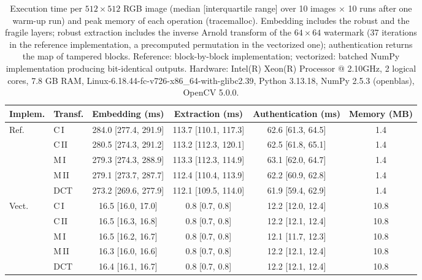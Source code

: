 \begin{table}[t]
\centering
\caption{Execution time per $512\times512$ RGB image (median [interquartile range] over 10 images $\times$ 10 runs after one warm-up run) and peak memory of each operation (tracemalloc). Embedding includes the robust and the fragile layers; robust extraction includes the inverse Arnold transform of the $64\times64$ watermark (37 iterations in the reference implementation, a precomputed permutation in the vectorized one); authentication returns the map of tampered blocks. Reference: block-by-block implementation; vectorized: batched NumPy implementation producing bit-identical outputs. Hardware: Intel(R) Xeon(R) Processor @ 2.10GHz, 2 logical cores, 7.8 GB RAM, Linux-6.18.44-fc-v726-x86\_64-with-glibc2.39, Python 3.13.18, NumPy 2.5.3 (openblas), OpenCV 5.0.0.}
\label{tab:execution_time}
\footnotesize
\setlength{\tabcolsep}{3pt}
\begin{tabular}{llcccc}
\toprule
Implem. & Transf. & Embedding (ms) & Extraction (ms) & Authentication (ms) & Memory (MB) \\
\midrule
Ref. & C\,I & 284.0 [277.4, 291.9] & 113.7 [110.1, 117.3] & 62.6 [61.3, 64.5] & 1.4 \\
 & C\,II & 280.5 [274.3, 291.2] & 113.2 [112.3, 120.1] & 62.5 [61.8, 65.1] & 1.4 \\
 & M\,I & 279.3 [274.3, 288.9] & 113.3 [112.3, 114.9] & 63.1 [62.0, 64.7] & 1.4 \\
 & M\,II & 279.1 [273.7, 287.7] & 112.4 [110.4, 113.9] & 62.2 [60.9, 62.8] & 1.4 \\
 & DCT & 273.2 [269.6, 277.9] & 112.1 [109.5, 114.0] & 61.9 [59.4, 62.9] & 1.4 \\
\midrule
Vect. & C\,I & 16.5 [16.0, 17.0] & 0.8 [0.7, 0.8] & 12.2 [12.0, 12.4] & 10.8 \\
 & C\,II & 16.5 [16.3, 16.8] & 0.8 [0.7, 0.8] & 12.2 [12.1, 12.4] & 10.8 \\
 & M\,I & 16.5 [16.2, 16.7] & 0.8 [0.7, 0.8] & 12.1 [11.7, 12.3] & 10.8 \\
 & M\,II & 16.3 [16.0, 16.6] & 0.8 [0.7, 0.8] & 12.2 [12.1, 12.4] & 10.8 \\
 & DCT & 16.4 [16.1, 16.7] & 0.8 [0.7, 0.8] & 12.2 [12.1, 12.4] & 10.8 \\
\bottomrule
\end{tabular}
\end{table}
